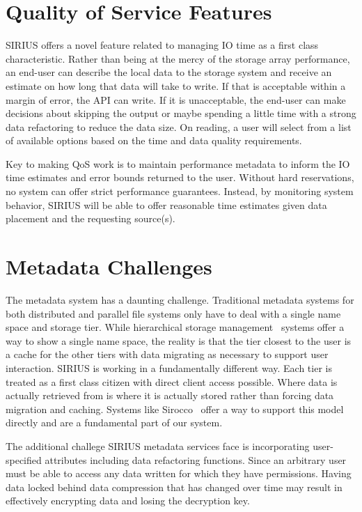 \documentclass[letterpaper,twocolumn,10pt]{article}
\begin{document}
\section{Quality of Service Features}
\label{sec:qos}

SIRIUS offers a novel feature related to managing IO time as a first class
characteristic. Rather than being at the mercy of the storage array
performance, an end-user can describe the local data to the storage system and
receive an estimate on how long that data will take to write. If that is
acceptable within a margin of error, the API can write. If it is unacceptable,
the end-user can make decisions about skipping the output or maybe spending a
little time with a strong data refactoring to reduce the data size.  On
reading, a user will select from a list of available options based on the time
and data quality requirements.

Key to making QoS work is to maintain performance metadata to inform the IO
time estimates and error bounds returned to the user. Without hard
reservations, no system can offer strict performance guarantees. Instead, by
monitoring system behavior, SIRIUS will be able to offer reasonable time
estimates given data placement and the requesting source(s).

\section{Metadata Challenges}
\label{sec:metadata}

The metadata system has a daunting challenge. Traditional metadata systems for
both distributed and parallel file systems only have to deal with a single name
space and storage tier. While hierarchical storage
management~\cite{blaze:1992:hsm} systems offer a way to show a single name
space, the reality is that the tier closest to the user is a cache for the
other tiers with data migrating as necessary to support user interaction.
SIRIUS is working in a fundamentally different way. Each tier is treated as a
first class citizen with direct client access possible. Where data is actually
retrieved from is where it is actually stored rather than forcing data
migration and caching. Systems like Sirocco~\cite{curry:2015:sirocco} offer a
way to support this model directly and are a fundamental part of our system.

The additional challege SIRIUS metadata services face is incorporating
user-specified attributes including data refactoring functions. Since an
arbitrary user must be able to access any data written for which they have
permissions. Having data locked behind data compression that has changed over
time may result in effectively encrypting data and losing the decryption key.
\end{document}
